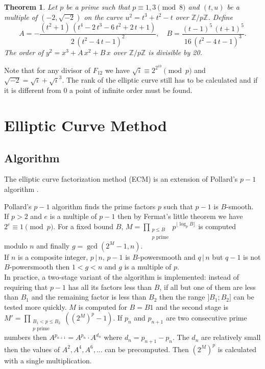 \documentclass[a4paper, 11pt, pdftex]{report}
\theoremstyle{plain}
\newtheorem{theorem}{Theorem}[chapter]
\theoremstyle{definition}
\begin{document}
\begin{theorem}
Let $p$ be a prime such that $p \equiv 1, 3 \pmod{8}$ and $(t, u)$ be a multiple
of $(-2, \sqrt{-2})$ on the curve $u^2 = t^3 + t^2 - t$ over $\mathbb{Z}/p\mathbb{Z}$.
Define
$$A = -\frac{(t^2 + 1)\,(t^4 - 2\,t^3 - 6 \,t^2 + 2\,t + 1)}{2\,(t^2 - 4\,t - 1)^2},\quad
B = \frac{(t - 1)^5\,(t + 1)^5}{16\,(t^2 - 4\,t - 1)^3}.$$
The order of $y^2 = x^3 + A\,x^2 + B\,x$ over $\mathbb{Z}/p\mathbb{Z}$ is divisible by 20.
\end{theorem}
Note that for any divisor of $F_{12}$ we have $\sqrt{i} \equiv 2^{2^{10}} \pmod{p}$ and
$\sqrt{-2} = \sqrt{i} + \sqrt{i}^3$.
The rank of the elliptic curve still has to be calculated and if it is different from 0
a point of infinite order must be found.

\chapter{Elliptic Curve Method}

\section{Algorithm}

The elliptic curve factorization method (ECM) is an extension of Pollard's $p - 1$ algorithm
\cite{Pollard1}.

Pollard's $p - 1$ algorithm finds the prime factors $p$ such that $p - 1$ is $B$-smooth.\\
If $p > 2$ and $e$ is a multiple of $p - 1$ then by Fermat's little theorem we have
$2^e \equiv 1  \pmod{p}$. For a fixed bound $B$,
$M = \prod_{\substack{p \le B\\ p \text{ prime}}} p^{ \lfloor \log_p{B} \rfloor }$
is computed modulo $n$ and finally $g = \gcd(2^M - 1, n)$.\\ If $n$ is a composite integer,
$p\, |\, n$, $p - 1$ is $B$-powersmooth and $q\, |\, n$ but $q - 1$ is not $B$-powersmooth
then $ 1 < g < n$ and $g$ is a multiple of $p$.\\
In practice, a two-stage variant of the algorithm is implemented: instead of requiring that
$p - 1$ has all its factors less than $B$, if all but one of them are less than $B_1$ and
the remaining factor is less than $B_2$ then the range $]B_1; B_2]$ can be tested more quickly.
$M$ is computed for $B = B1$ and the second stage is
$M' = \prod_{\substack{B_1 < p \le B_2\\ p \text{ prime}}} \left((2^M)^p - 1 \right)$.
If $p_n$ and $p_{n+1}$ are two consecutive prime numbers then $A^{p_{n+1}} = A^{p_n} \cdot A^{d_n}$
where $d_n = p_{n+1} - p_n$. The $d_n$ are relatively small then the values of $A^2, A^4, A^6, \ldots$
can be precomputed. Then $\left(2^M \right)^p$ is calculated with a single multiplication. 
\end{document}

